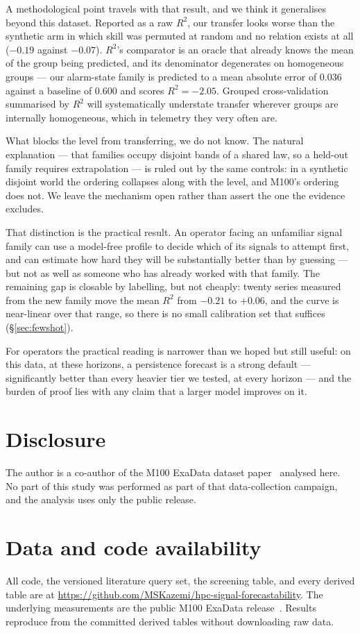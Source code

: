 \documentclass[11pt,a4paper]{article}
\newcommand{\num}[1]{#1}
\begin{document}
A methodological point travels with that result, and we think it generalises
beyond this dataset. Reported as a raw \(R^2\), our transfer looks worse than
the synthetic arm in which skill was permuted at random and no relation exists
at all (\(-0.19\) against \(-0.07\)). \(R^2\)'s comparator is an oracle that
already knows the mean of the group being predicted, and its denominator
degenerates on homogeneous groups --- our alarm-state family is predicted to a
mean absolute error of \num{0.036} against a baseline of \num{0.600} and scores
\(R^2=-2.05\). Grouped cross-validation summarised by \(R^2\) will
systematically understate transfer wherever groups are internally homogeneous,
which in telemetry they very often are.

What blocks the level from transferring, we do not know. The natural
explanation --- that families occupy disjoint bands of a shared law, so a
held-out family requires extrapolation --- is ruled out by the same controls:
in a synthetic disjoint world the ordering collapses along with the level, and
M100's ordering does not. We leave the mechanism open rather than assert the
one the evidence excludes.

That distinction is the practical result. An operator facing an unfamiliar
signal family can use a model-free profile to decide which of its signals to
attempt first, and can estimate how hard they will be substantially better than
by guessing --- but not as well as someone who has already worked with that
family. The remaining gap is closable by labelling, but not cheaply: twenty
series measured from the new family move the mean \(R^2\) from \(-0.21\) to
\(+0.06\), and the curve is near-linear over that range, so there is no small
calibration set that suffices (\S\ref{sec:fewshot}).

For operators the practical reading is narrower than we hoped but still useful:
on this data, at these horizons, a persistence forecast is a strong default ---
significantly better than every heavier tier we tested, at every horizon --- and
the burden of proof lies with any claim that a larger model improves on it.

\section*{Disclosure}

The author is a co-author of the M100 ExaData dataset paper~\citep{borghesi2023m100}
analysed here. No part of this study was performed as part of that data-collection
campaign, and the analysis uses only the public release.

\section*{Data and code availability}

All code, the versioned literature query set, the screening table, and every
derived table are at
\url{https://github.com/MSKazemi/hpc-signal-forecastability}. The underlying
measurements are the public M100 ExaData release~\citep{borghesi2023m100}.
Results reproduce from the committed derived tables without downloading raw
data.



\end{document}
